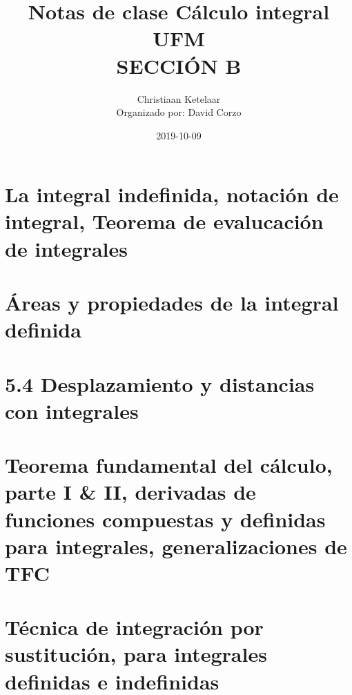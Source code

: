 \documentclass{book}
\title{Notas de clase Cálculo integral \\ UFM \\ SECCIÓN B}
\author{Christiaan Ketelaar \\ Organizado por: David Corzo}
\date{2019-10-09}
\begin{document}
\maketitle
\tableofcontents


\chapter{La integral indefinida, notación de integral, Teorema de evalucación de integrales} 


\chapter{Áreas y propiedades de la integral definida} 


\chapter{5.4 Desplazamiento y distancias con integrales}

\chapter{Teorema fundamental del cálculo, parte I \& II, derivadas de funciones compuestas y definidas para integrales, generalizaciones de TFC} 

\chapter{Técnica de integración por sustitución, para integrales definidas e indefinidas} 

\end{document}

